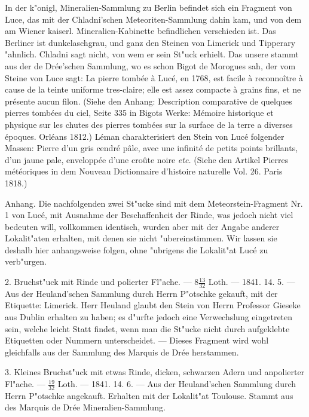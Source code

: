 \documentclass[a4paper, 11pt, oneside, polutonikogreek, german]{article}
\begin{document}
{\footnotesize In der k"onigl, Mineralien-Sammlung zu Berlin befindet sich ein Fragment von Luce, das mit der Chladni'schen Meteoriten-Sammlung dahin kam, und von dem am Wiener kaiserl. Mineralien-Kabinette befindlichen verschieden ist. Das Berliner ist dunkelaschgrau, und ganz den Steinen von Limerick und Tipperary "ahnlich. Chladni sagt nicht, von wem er sein St"uck erhielt. Das unsere stammt aus der de Drée'schen Sammlung, wo es schon Bigot de Morogues sah, der vom Steine von Luce sagt: La pierre tombée à Lucé, en 1768, est facile à reconnoître à cause de la teinte uniforme tres-claire; elle est assez compacte à grains fins, et ne présente aucun filon. (Siehe den Anhang: Description comparative de quelques pierres tombées du ciel, Seite 335 in Bigots Werke: Mémoire historique et physique sur les chutes des pierres tombées sur la surface de la terre a diverses époques. Orléans 1812.) Léman charakterisiert den Stein von Lucé folgender Massen: Pierre d’un gris cendré pâle, avec une infinité de petits points brillants, d'un jaune pale, enveloppée d'une croûte noire \emph{etc.} (Siehe den Artikel Pierres météoriques in dem Nouveau Dictionnaire d'histoire naturelle Vol. 26. Paris 1818.)}

\setlength{\leftskip}{0pt}
\setlength{\parindent}{20pt}

Anhang. Die nachfolgenden zwei St"ucke sind mit dem Meteorstein-Fragment Nr. 1 von Lucé, mit Ausnahme der Beschaffenheit der Rinde, was jedoch nicht viel bedeuten will, vollkommen identisch, wurden aber mit der Angabe anderer Lokalit"aten erhalten, mit denen sie nicht "ubereinstimmen. Wir lassen sie deshalb hier anhangsweise folgen, ohne "ubrigens die Lokalit"at Lucé zu verb"urgen.

2. Bruchst"uck mit Rinde und polierter Fl"ache. --- $\mathfrak{8\frac{13}{32}}$ Loth. --- 1841. 14. 5. --- Aus der Heuland'schen Sammlung durch Herrn P"otschke gekauft, mit der Etiquette: Limerick. Herr Heuland glaubt den Stein von Herrn Professor Gieseke aus Dublin erhalten zu haben; es d"urfte jedoch eine Verwechslung eingetreten sein, welche leicht Statt findet, wenn man die St"ucke nicht durch aufgeklebte Etiquetten oder Nummern unterscheidet. --- Dieses Fragment wird wohl gleichfalls aus der Sammlung des Marquis de Drée herstammen.

3. Kleines Bruchst"uck mit etwas Rinde, dicken, schwarzen Adern und anpolierter Fl"ache. --- $\mathfrak{\frac{19}{32}}$ Loth. --- 1841. 14. 6. --- Aus der Heuland'schen Sammlung durch Herrn P"otschke angekauft. Erhalten mit der Lokalit"at Toulouse. Stammt aus des Marquis de Drée Mineralien-Sammlung.
\end{document}
